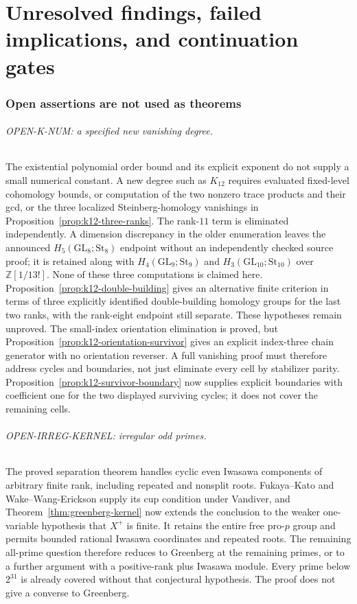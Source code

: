 \documentclass[11pt,a4paper]{article}
\theoremstyle{definition}
\begin{document}
\normalsize



\clearpage
\part{Unresolved findings, failed implications, and continuation gates}
\section{Open assertions are not used as theorems}

\paragraph{OPEN-K-NUM: a specified new vanishing degree.}
The existential polynomial order bound and its explicit exponent do
not supply a small numerical constant. A new degree such as $K_{12}$
requires evaluated fixed-level cohomology bounds, or computation of the
two nonzero trace products and their gcd, or the three localized
Steinberg-homology vanishings in Proposition~\ref{prop:k12-three-ranks}.
The rank-$11$ term is eliminated independently. A dimension discrepancy
in the older enumeration leaves the announced $H_5(\mathrm{GL}_8;\mathrm{St}_8)$
endpoint without an independently checked source proof; it is retained
along with $H_4(\mathrm{GL}_9;\mathrm{St}_9)$ and
$H_3(\mathrm{GL}_{10};\mathrm{St}_{10})$ over $\mathbb Z[1/13!]$.
None of these three computations is claimed here.
Proposition~\ref{prop:k12-double-building} gives an alternative finite
criterion in terms of three explicitly identified double-building
homology groups for the last two ranks, with the rank-eight endpoint
still separate. These hypotheses remain unproved.
The small-index orientation elimination is proved, but
Proposition~\ref{prop:k12-orientation-survivor} gives an explicit
index-three chain generator with no orientation reverser. A full
vanishing proof must therefore address cycles and boundaries, not
just eliminate every cell by stabilizer parity.
Proposition~\ref{prop:k12-survivor-boundary} now supplies explicit
boundaries with coefficient one for the two displayed surviving
cycles; it does not cover the remaining cells.

\paragraph{OPEN-IRREG-KERNEL: irregular odd primes.}
The proved separation theorem handles cyclic even Iwasawa components of
arbitrary finite rank, including repeated and nonsplit roots.
Fukaya--Kato and Wake--Wang-Erickson supply its cup condition under
Vandiver, and Theorem~\ref{thm:greenberg-kernel} now extends the
conclusion to the weaker one-variable hypothesis that $X^+$ is finite.
It retains the entire free pro-$p$ group and permits bounded rational
Iwasawa coordinates and repeated roots. The remaining all-prime
question therefore reduces to Greenberg at the remaining primes, or
to a further argument with a positive-rank plus Iwasawa module.
Every prime below $2^{31}$ is already covered without that conjectural
hypothesis. The proof does not give a converse to Greenberg.
\end{document}
